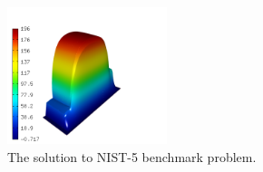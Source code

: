 \documentclass[12pt]{elsarticle}
\begin{document}
\begin{figure}[!ht]
\centering
\includegraphics[height=4cm]{nist/nist-5/solution.png}
\caption{The solution to NIST-5 benchmark problem.}
\label{fig:sln-nist05}
\end{figure}


\end{document}
